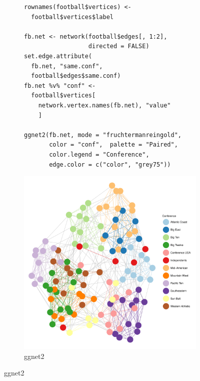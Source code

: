 \begin{figure}[hbtp]
\begin{subfigure}[t]{\textwidth}
\caption{ggnet2}\vspace{-.5cm}
\vspace{1em}

             \begin{adjustbox}{valign=t}

             \begin{minipage}{.49\textwidth}
 \begin{knitrout}\footnotesize
{}\color{fgcolor}\begin{kframe}
\begin{verbatim}
rownames(football$vertices) <-
  football$vertices$label

fb.net <- network(football$edges[, 1:2],
                  directed = FALSE)
set.edge.attribute(
  fb.net, "same.conf",
  football$edges$same.conf)
fb.net %v% "conf" <-
  football$vertices[
    network.vertex.names(fb.net), "value"
    ]

ggnet2(fb.net, mode = "fruchtermanreingold",
       color = "conf",  palette = "Paired",
       color.legend = "Conference",
       edge.color = c("color", "grey75"))
\end{verbatim}
\end{kframe}
\end{knitrout} \vspace{1em}

                   \end{minipage}

                  \begin{minipage}{.49\textwidth}

\includegraphics[width=\textwidth]{figure/football_ggnet2-1.pdf}


\end{minipage}
\end{adjustbox}
\end{subfigure}
\end{figure}
